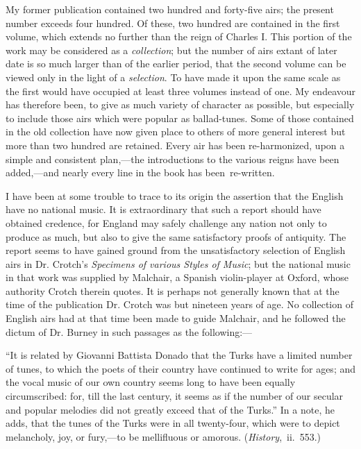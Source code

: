 My former publication contained two hundred and forty-five airs; the present
number exceeds four hundred. Of these, two hundred are contained in the first
volume, which extends no further than the reign of Charles I. This portion of
the work may be considered as a \textit{collection}; but the number of airs extant of later
date is so much larger than of the earlier period, that the second volume can be
viewed only in the light of a \textit{selection}. To have made it upon the same scale as the
first would have occupied at least three volumes instead of one. My endeavour
has therefore been, to give as much variety of character as possible, but especially
to include those airs which were popular as ballad-tunes. Some of those contained
in the old collection have now given place to others of more general interest but
more than two hundred are retained. Every air has been re-harmonized, upon a
simple and consistent plan,—the introductions to the various reigns have been
added,—and nearly every line in the book has been~re-written.

 
I have been at some trouble to trace to its origin \pagebreak
the assertion that the English
have no national music. It is extraordinary that such a report should have 
obtained credence, for England may safely challenge any nation not only to produce
as much, but also to give the same satisfactory proofs of antiquity. The
report seems to have gained ground from the unsatisfactory selection of English
airs in Dr. Crotch’s \textit{Specimens of various Styles of Music}; but the national music
in that work was supplied by Malchair, a Spanish violin-player at Oxford, whose
authority Crotch therein quotes. It is perhaps not generally known that at the
time of the publication Dr. Crotch was but nineteen years of age. No collection
of English airs had at that time been made to guide Malchair, and he followed
the dictum of Dr. Burney in such passages as the following:—

“It is related by Giovanni Battista Donado that the Turks have a limited
number of tunes, to which the poets of their country have continued to write for
ages; and the vocal music of our own country seems long to have been equally
circumscribed: for, till the last century, it seems as if the number of our secular
and popular melodies did not greatly exceed that of the Turks.” In a note, he
adds, that the tunes of the Turks were in all twenty-four, which were to depict
melancholy, joy, or fury,—to be mellifluous or amorous. (\textit{History},~ii.~553.)

